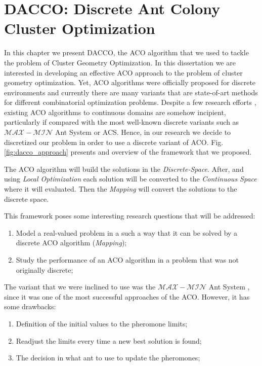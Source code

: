 \chapter{DACCO: Discrete Ant Colony Cluster Optimization}
\label{chap:dacco}

In this chapter we present DACCO, the ACO algorithm that we used to tackle the problem of Cluster Geometry Optimization. In this dissertation we are interested in developing an effective ACO approach to the problem of cluster geometry optimization. Yet, ACO algorithms were officially proposed for discrete environments and currently there are many variants that are state-of-art methods for different combinatorial optimization problems. Despite a few research efforts \cite{bilchev95, kong06, socha04, tsutsui04}, existing ACO algorithms to continuous domains are somehow incipient, particularly if compared with the most well-known discrete variants such as $\mathcal{MAX}-\mathcal{MIN}$ Ant System or ACS. Hence, in our research we decide to discretized our problem in order to use a discrete variant of ACO. Fig. \ref{fig:dacco_approach} presents and overview of the framework that we proposed.  


The ACO algorithm will build the solutions in the \emph{Discrete-Space}. After, and using \emph{Local Optimization} each solution will be converted to the \emph{Continuous Space} where it will evaluated. Then the \emph{Mapping} will convert the solutions to the discrete space.

This framework poses some interesting research questions that will be addressed:
\begin{enumerate}
	\item Model a real-valued problem in a such a way that it can be solved by a discrete ACO algorithm (\emph{Mapping});
	\item Study the performance of an ACO algorithm in a problem that was not originally discrete;
\end{enumerate}

The variant that we were inclined to use was the $\mathcal{MAX}-\mathcal{MIN}$ Ant System \cite{stutzle00}, since it was one of the most successful approaches of the ACO.  However, it has some drawbacks:
\begin{enumerate}
	\item Definition of the initial values to the pheromone limits;
	\item Readjust the limits every time a new best solution is found; 
	\item The decision in what ant to use to update the pheromones;
\end{enumerate}

